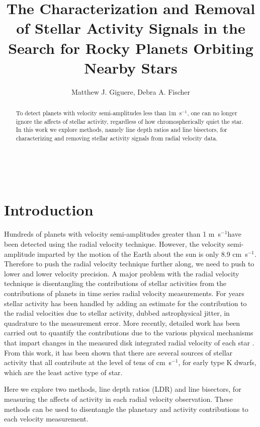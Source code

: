 \documentclass[iop]{emulateapj}
\def\cms{\mbox{cm s$^{-1}$}}
\def\ms{\mbox{m s$^{-1}$}}
\begin{document}
\title{The Characterization and Removal of Stellar Activity Signals in the Search for Rocky Planets Orbiting Nearby Stars}

\author{Matthew J. Giguere, Debra A. Fischer}	

\begin{abstract}
To detect planets with velocity semi-amplitudes less than 1\ms, one can no longer ignore the affects of stellar activity, regardless of how chromospherically quiet the star. In this work we explore methods, namely line depth ratios and line bisectors, for characterizing and removing stellar activity signals from radial velocity data.
\end{abstract}


\ \


\section{Introduction}
Hundreds of planets with velocity semi-amplitudes greater than 1 \ms have been detected using the radial velocity technique. However, the velocity semi-amplitude imparted by the motion of the Earth about the sun is only 8.9 \cms. Therefore to push the radial velocity technique further along, we need to push to lower and lower velocity precision. A major problem with the radial velocity technique is disentangling the contributions of stellar activities from the contributions of planets in time series radial velocity measurements. For years stellar activity has been handled by adding an estimate for the contribution to the radial velocities due to stellar activity, dubbed astrophysical jitter, in quadrature to the measurement error\citep{Isaacson:2010gk}. More recently, detailed work has been carried out to quantify the contributions due to the various physical mechanisms that impart changes in the measured disk integrated radial velocity of each star \citep{2011A&A...525A.140D, 2011A&A...527A..82D}. From this work, it has been shown that there are several sources of stellar activity that all contribute at the level of tens of \cms, for early type K dwarfs, which are the least active type of star. 

Here we explore two methods, line depth ratios (LDR) and line bisectors, for measuring the affects of activity in each radial velocity observation. These methods can be used to disentangle the planetary and activity contributions to each velocity measurement.
\end{document}
